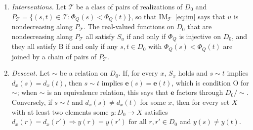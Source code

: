 \begin{theorem}
\begin{enumerate}
\item[(iv)] \emph{Interventions.} Let $\mathcal T$ be a class of pairs of realizations of $D_0$ and $P_{\mathcal T}=\{(s,t)\in\mathcal T:\Phi_Q(s)<\Phi_Q(t)\}$, so that $\mathrm{IM}_{\mathcal T}$~\eqref{eq:im} says that $u$ is nondecreasing along $P_{\mathcal T}$. The real-valued functions on $D_0$ that are nondecreasing along $P_{\mathcal T}$ all satisfy $S_u$ if and only if $\Phi_Q$ is injective on $D_0$, and they all satisfy $\mathrm B$ if and only if any $s,t\in D_0$ with $\Phi_Q(s)<\Phi_Q(t)$ are joined by a chain of pairs of $P_{\mathcal T}$.
\item[(v)] \emph{Descent.} Let $\sim$ be a relation on $D_0$. If, for every $x$, $S_x$ holds and $s\sim t$ implies $d_x(s)=d_x(t)$, then $s\sim t$ implies $\mathbf e(s)=\mathbf e(t)$, which is condition O for $\sim$; when $\sim$ is an equivalence relation, this says that $\mathbf e$ factors through $D_0/{\sim}$. Conversely, if $s\sim t$ and $d_x(s)\ne d_x(t)$ for some $x$, then for every set $X$ with at least two elements some $y:D_0\to X$ satisfies $d_x(r)=d_x(r')\Rightarrow y(r)=y(r')$ for all $r,r'\in D_0$ and $y(s)\ne y(t)$.
\end{enumerate}
\end{theorem}
